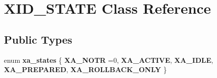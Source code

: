\hypertarget{classXID__STATE}{}\section{X\+I\+D\+\_\+\+S\+T\+A\+TE Class Reference}
\label{classXID__STATE}
\subsection*{Public Types}
\begin{DoxyCompactItemize}
\item 
\mbox{\label{classXID__STATE_a142676d46c9c5724d67ae56d8738f953}} 
enum {\bfseries xa\+\_\+states} \{ \newline
{\bfseries X\+A\+\_\+\+N\+O\+TR} =0, 
{\bfseries X\+A\+\_\+\+A\+C\+T\+I\+VE}, 
{\bfseries X\+A\+\_\+\+I\+D\+LE}, 
{\bfseries X\+A\+\_\+\+P\+R\+E\+P\+A\+R\+ED}, 
\newline
{\bfseries X\+A\+\_\+\+R\+O\+L\+L\+B\+A\+C\+K\+\_\+\+O\+N\+LY}
 \}
\end{DoxyCompactItemize}
